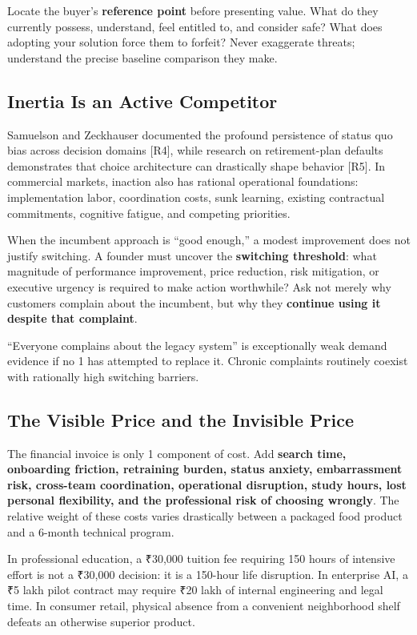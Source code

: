 Locate the buyer's \textbf{reference point} before presenting value. What do they currently possess, understand, feel entitled to, and consider safe? What does adopting your solution force them to forfeit? Never exaggerate threats; understand the precise baseline comparison they make.

\subsection{Inertia Is an Active Competitor}

Samuelson and Zeckhauser documented the profound persistence of status quo bias across decision domains [R4], while research on retirement-plan defaults demonstrates that choice architecture can drastically shape behavior [R5]. In commercial markets, inaction also has rational operational foundations: implementation labor, coordination costs, sunk learning, existing contractual commitments, cognitive fatigue, and competing priorities.

When the incumbent approach is ``good enough,'' a modest improvement does not justify switching. A founder must uncover the \textbf{switching threshold}: what magnitude of performance improvement, price reduction, risk mitigation, or executive urgency is required to make action worthwhile? Ask not merely why customers complain about the incumbent, but why they \textbf{continue using it despite that complaint}.

``Everyone complains about the legacy system'' is exceptionally weak demand evidence if no 1 has attempted to replace it. Chronic complaints routinely coexist with rationally high switching barriers.

\subsection{The Visible Price and the Invisible Price}

The financial invoice is only 1 component of cost. Add \textbf{search time, onboarding friction, retraining burden, status anxiety, embarrassment risk, cross-team coordination, operational disruption, study hours, lost personal flexibility, and the professional risk of choosing wrongly}. The relative weight of these costs varies drastically between a packaged food product and a 6-month technical program.

In professional education, a ₹30,000 tuition fee requiring 150 hours of intensive effort is not a ₹30,000 decision: it is a 150-hour life disruption. In enterprise AI, a ₹5 lakh pilot contract may require ₹20 lakh of internal engineering and legal time. In consumer retail, physical absence from a convenient neighborhood shelf defeats an otherwise superior product.


